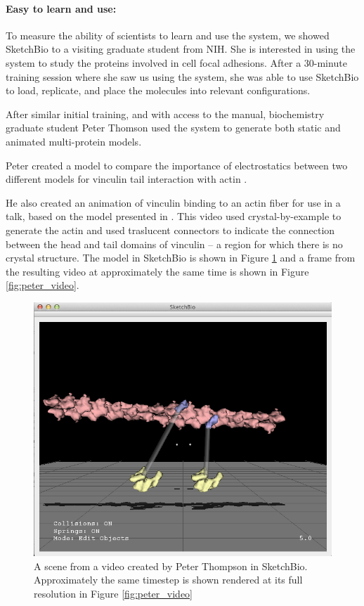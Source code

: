 \documentclass[twocolumn]{bmcart}%
\begin{document}
\paragraph*{Easy to learn and use:}
To measure the ability of scientists to learn and use the system, we showed SketchBio to a visiting graduate student from NIH.  She is interested in using the system to study the proteins involved in cell focal adhesions.
After a 30-minute training session where she saw us using the system, she was able to use SketchBio to load, replicate, and place the molecules into relevant configurations.

After similar initial training, and with access to the manual, biochemistry graduate student Peter Thomson used the system to generate both static and animated multi-protein models.

Peter created a model to compare the importance of electrostatics between two different models for vinculin tail interaction with actin \cite{janssen2006three}\cite{thompson2014identification}.

He also created an animation of vinculin binding to an actin fiber for use in a talk, based on the model presented in \cite{thievessen2013vinculin}.
This video used crystal-by-example to generate the actin and used traslucent connectors to indicate the connection between the head and tail domains of vinculin -- a region for which there is no crystal structure.
The model in SketchBio is shown in Figure \ref{fig:peter_model} and a frame from the resulting video at approximately the same time is shown in Figure \ref{fig:peter_video}.

\begin{figure}[h]
\centering
\includegraphics[width=0.9\columnwidth]{peter_model.png}
\caption{A scene from a video created by Peter Thompson in SketchBio.
Approximately the same timestep is shown rendered at its full resolution in Figure \ref{fig:peter_video}}
\label{fig:peter_model}
\end{figure}
\end{document}
